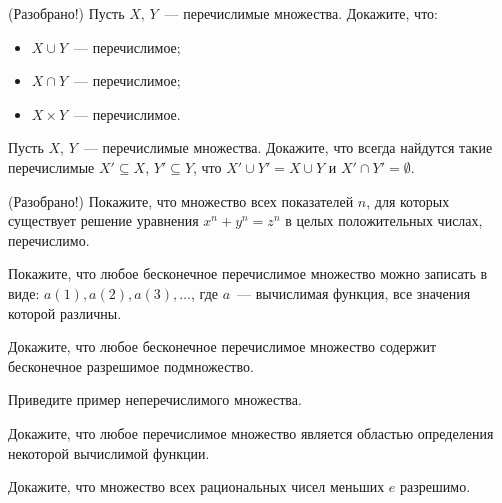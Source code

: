 \setcounter{curtask}{1}


\begin{task} (Разобрано!)
    Пусть $X$, $Y$~--- перечислимые множества. Докажите, что:
    \begin{itemize}
	    \item $X \cup Y$~--- перечислимое;
	    \item $X \cap Y$~--- перечислимое;
      	\item $X \times Y$~--- перечислимое.
    \end{itemize}
\end{task}

\begin{task}
    Пусть $X$, $Y$~--- перечислимые множества. Докажите, что всегда
    найдутся такие перечислимые $X' \subseteq X$, $Y' \subseteq Y$,
    что $X' \cup Y' = X \cup Y$ и $X' \cap Y' = \emptyset$.
\end{task}

\begin{task} (Разобрано!)
    Покажите, что множество всех показателей $n$, для которых
    существует решение уравнения $x^n + y^n = z^n$ в целых положительных числах,
    перечислимо.
\end{task}

\begin{task}
    Покажите, что любое бесконечное перечислимое множество можно
    записать в виде: ${a(1), a(2), a(3), \dots}$, где $a$~---
    вычислимая функция, все значения которой различны.
\end{task}

\begin{task}
    Докажите, что любое бесконечное перечислимое множество содержит
    бесконечное разрешимое подмножество.
\end{task}

\begin{task}
    Приведите пример неперечислимого множества.
\end{task}

\begin{task}
    Докажите, что любое перечислимое множество является областью определения
	некоторой вычислимой функции.
\end{task}

\begin{task}
    Докажите, что множество всех рациональных чисел меньших $e$ разрешимо.
\end{task}